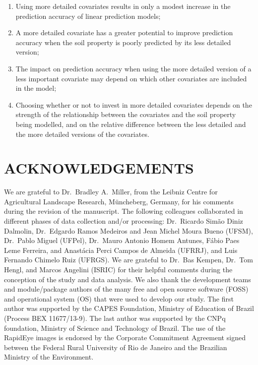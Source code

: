 \begin{enumerate}
 \item Using more detailed covariates results in only a modest increase in the prediction accuracy of linear 
 prediction models;
 
 \item A more detailed covariate has a greater potential to improve prediction accuracy when the soil property
 is poorly predicted by its less detailed version;
 
 \item The impact on prediction accuracy when using the more detailed version of a less important covariate 
 may depend on which other covariates are included in the model;
 
 \item Choosing whether or not to invest in more detailed covariates depends on the strength of the 
 relationship between the covariates and the soil property being modelled, and on the relative difference 
 between the less detailed and the more detailed versions of the covariates.
\end{enumerate}

\section*{ACKNOWLEDGEMENTS}

We are grateful to Dr.~Bradley A.~Miller, from the Leibniz Centre for Agricultural Landscape Research, 
M\"uncheberg, Germany, for his comments during the revision of the manuscript. The following colleagues 
collaborated in different phases of data collection and/or processing: Dr.~Ricardo Simão Diniz Dalmolin, 
Dr.~Edgardo Ramos Medeiros and Jean Michel Moura Bueno (UFSM), Dr.~Pablo Miguel (UFPel), Dr.~Mauro Antonio 
Homem Antunes, Fábio Paes Leme Ferreira, and Anastácia Perci Campos de Almeida (UFRRJ), and Luis Fernando 
Chimelo Ruiz (UFRGS). We are grateful to Dr.~Bas Kempen, Dr.~Tom Hengl, and Marcos Angelini (ISRIC) for their 
helpful comments during the conception of the study and data analysis. We also thank the development teams and 
module/package authors of the many free and open source software (FOSS) and operational system (OS) that were 
used to develop our study. The first author was supported by the CAPES Foundation, Ministry of Education of 
Brazil (Process BEX 11677/13-9). The last author was supported by the CNPq foundation, Ministry of Science and 
Technology of Brazil. The use of the RapidEye images is endorsed by the Corporate Commitment Agreement signed 
between the Federal Rural University of Rio de Janeiro and the Brazilian Ministry of the Environment.

